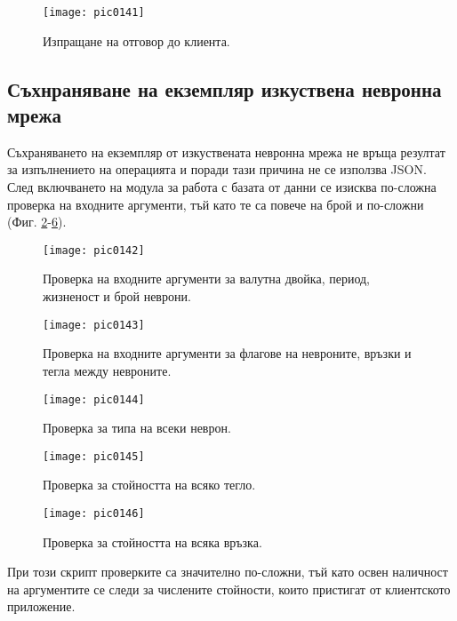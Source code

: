 \begin{figure}[h]
  \centering
  \texttt{[image: pic0141]}
  \caption{Изпращане на отговор до клиента.}
\label{fig:pic0141}
\end{figure}
\FloatBarrier

\subsection{Съхнраняване на екземпляр изкуствена невронна мрежа}

Съхраняването на екземпляр от изкуствената невронна мрежа не връща резултат за изпълнението на операцията и поради тази причина не се използва JSON. След включването на модула за работа с базата от данни се изисква по-сложна проверка на входните аргументи, тъй като те са повече на брой и по-сложни (Фиг. \ref{fig:pic0142}-\ref{fig:pic0146}). 

\begin{figure}[h]
  \centering
  \texttt{[image: pic0142]}
  \caption{Проверка на входните аргументи за валутна двойка, период, жизненост и брой неврони.}
\label{fig:pic0142}
\end{figure}
\FloatBarrier

\begin{figure}[h]
  \centering
  \texttt{[image: pic0143]}
  \caption{Проверка на входните аргументи за флагове на невроните, връзки и тегла между невроните.}
\label{fig:pic0143}
\end{figure}
\FloatBarrier

\begin{figure}[h]
  \centering
  \texttt{[image: pic0144]}
  \caption{Проверка за типа на всеки неврон.}
\label{fig:pic0144}
\end{figure}
\FloatBarrier

\begin{figure}[h]
  \centering
  \texttt{[image: pic0145]}
  \caption{Проверка за стойността на всяко тегло.}
\label{fig:pic0145}
\end{figure}
\FloatBarrier

\begin{figure}[h]
  \centering
  \texttt{[image: pic0146]}
  \caption{Проверка за стойността на всяка връзка.}
\label{fig:pic0146}
\end{figure}
\FloatBarrier

При този скрипт проверките са значително по-сложни, тъй като освен наличност на аргументите се следи за числените стойности, които пристигат от клиентското приложение. 

